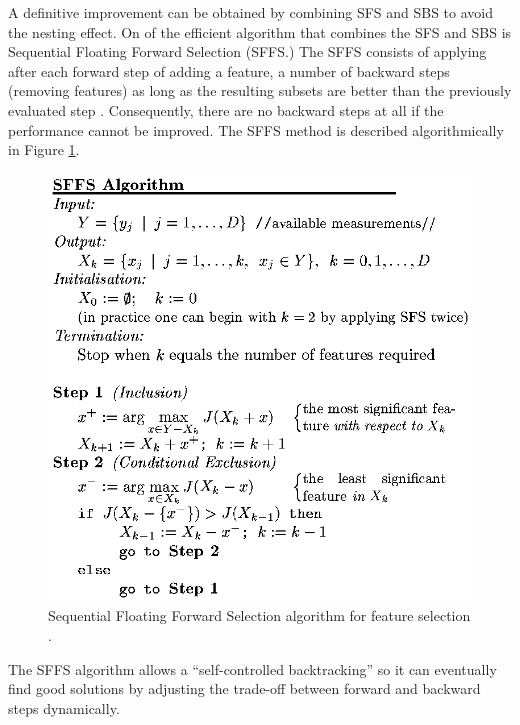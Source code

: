 A definitive improvement can be obtained by combining SFS and SBS to
avoid the nesting effect. On of the efficient algorithm that
combines the SFS and SBS is Sequential Floating  Forward Selection
(SFFS.) The SFFS consists of applying after each forward step of
adding a feature, a number of backward steps (removing features) as
long as the resulting subsets are better than the previously
evaluated step \cite{Pudil94}. Consequently, there are no backward
steps at all if the performance cannot be improved. The SFFS method
is described algorithmically in Figure \ref{fig_sffs}.
\begin{figure}[tbp]
\begin{center}
\includegraphics[scale = 1, width = 5.0in, ]{./chapters/figures/sffs_alg.eps}
\caption{Sequential Floating Forward Selection algorithm for feature
selection \cite{Pudil94}.}\label{fig_sffs}
\end{center}
\end{figure}
The SFFS algorithm allows a ``self-controlled backtracking'' so it
can eventually find good solutions by adjusting the trade-off
between forward and backward steps dynamically.
